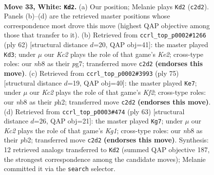 \documentclass[11pt]{article}
\begin{document}
\clearpage

\begin{figure}[p]\centering
\begin{subfigure}{0.46\textwidth}\centering
\resizebox{\linewidth}{!}{%
\newchessgame
\chessboard[
  setfen={1n5r/5k2/1p1p4/1P1P4/p1p5/7P/1PK3P1/7R w - - 0 33},
  showmover=false,
  pgfstyle=straightmove, color=movearrow, markmove={c2-d2}
]}
\caption{}
\end{subfigure}\hfill
\begin{subfigure}{0.46\textwidth}\centering
\resizebox{\linewidth}{!}{%
\newchessgame
\chessboard[
  setfen={8/2r3p1/8/p2k2p1/6Pp/2P4P/P3KP2/2R5 w - - 1 32},
  showmover=false,
  pgfstyle=straightmove, color=movearrow, markmove={e2-d3}
]}
\caption{}
\end{subfigure}
\\[4pt]
\begin{subfigure}{0.46\textwidth}\centering
\resizebox{\linewidth}{!}{%
\newchessgame
\chessboard[
  setfen={r7/p2P1kpp/1p6/1P6/4p3/1KP5/6PP/R7 b - - 0 38},
  showmover=false,
  pgfstyle=straightmove, color=movearrow, markmove={f7-e7}
]}
\caption{}
\end{subfigure}\hfill
\begin{subfigure}{0.46\textwidth}\centering
\resizebox{\linewidth}{!}{%
\newchessgame
\chessboard[
  setfen={r5k1/5p2/4p2p/1R4p1/p7/5PP1/PP5P/4K3 b - - 1 32},
  showmover=false,
  pgfstyle=straightmove, color=movearrow, markmove={g8-g7}
]}
\caption{}
\end{subfigure}
\caption{\textbf{Move 33, White: \texttt{Kd2}.} (a) Our position; Melanie plays \texttt{Kd2} (\texttt{c2d2}). Panels (b)--(d) are the retrieved master positions whose correspondence most drove this move (highest QAP objective among those that transfer to it). (b) Retrieved from \texttt{ccrl\_top\_p0002\#1266} (ply 62) [structural distance $d$=20, QAP obj=41]: the master played \texttt{Kd3}; under $\mu$ our \emph{Kc2} plays the role of that game's \emph{Ke2}; cross-type roles: our \emph{n}b8 as their \emph{p}g7; transferred move \texttt{c2d2} \textbf{(endorses this move)}. (c) Retrieved from \texttt{ccrl\_top\_p0002\#3993} (ply 75) [structural distance $d$=19, QAP obj=40]: the master played \texttt{Ke7}; under $\mu$ our \emph{Kc2} plays the role of that game's \emph{Kf2}; cross-type roles: our \emph{n}b8 as their \emph{p}h2; transferred move \texttt{c2d2} \textbf{(endorses this move)}. (d) Retrieved from \texttt{ccrl\_top\_p0003\#474} (ply 63) [structural distance $d$=26, QAP obj=21]: the master played \texttt{Kg7}; under $\mu$ our \emph{Kc2} plays the role of that game's \emph{Kg1}; cross-type roles: our \emph{n}b8 as their \emph{p}b2; transferred move \texttt{c2d2} \textbf{(endorses this move)}. Synthesis: 12 retrieved analogs transferred to \texttt{Kd2} (summed QAP objective 187, the strongest correspondence among the candidate moves); Melanie committed it via the \texttt{search} selector.}
\label{fig:thought-m64}
\end{figure}
\end{document}
